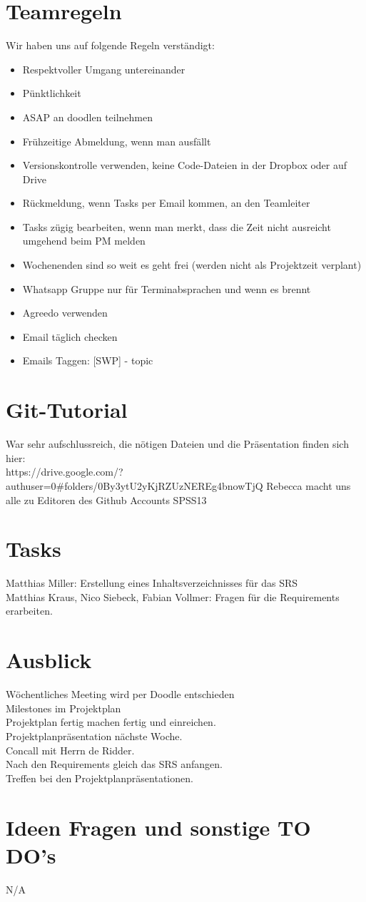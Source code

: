 \documentclass{scrartcl}
\begin{document}
\section{Teamregeln}
Wir haben uns auf folgende Regeln verständigt:
\begin{itemize}
\item Respektvoller Umgang untereinander
\item Pünktlichkeit
\item ASAP an doodlen teilnehmen
\item Frühzeitige Abmeldung, wenn man ausfällt
\item Versionskontrolle verwenden, keine Code-Dateien in der Dropbox oder auf Drive
\item Rückmeldung, wenn Tasks per Email kommen, an den Teamleiter
\item Tasks zügig bearbeiten, wenn man merkt, dass die Zeit nicht ausreicht umgehend beim PM melden
\item Wochenenden sind so weit es geht frei (werden nicht als Projektzeit verplant)
\item Whatsapp Gruppe nur für Terminabsprachen und wenn es brennt
\item Agreedo verwenden
\item Email täglich checken
\item Emails Taggen: [SWP] - topic
\end{itemize}
\section{Git-Tutorial}
War sehr aufschlussreich, die nötigen Dateien und die Präsentation finden sich hier:\\ https://drive.google.com/?authuser=0\#folders/0By3ytU2yKjRZUzNEREg4bnowTjQ
Rebecca macht uns alle zu Editoren des Github Accounts SPSS13
\section{Tasks}
Matthias Miller: Erstellung eines Inhaltsverzeichnisses für das SRS \\
Matthias Kraus, Nico Siebeck, Fabian Vollmer: Fragen für die Requirements erarbeiten.
\section{Ausblick}
Wöchentliches Meeting wird per Doodle entschieden\\
Milestones im Projektplan \\
Projektplan fertig machen fertig und einreichen. \\
Projektplanpräsentation nächste Woche. \\
Concall mit Herrn de Ridder. \\
Nach den Requirements gleich das SRS anfangen. \\
Treffen bei den Projektplanpräsentationen.
\section{Ideen Fragen und sonstige TO DO's}
N/A
\end{document}
